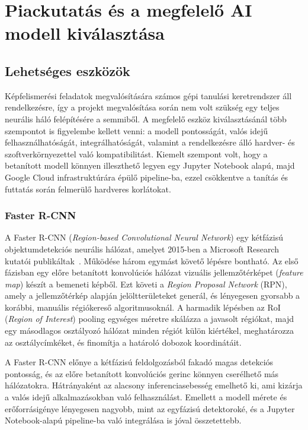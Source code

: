     \section{Piackutatás és a megfelelő AI modell kiválasztása}

        \subsection{Lehetséges eszközök}

        Képfelismerési feladatok megvalósítására számos gépi tanulási keretrendszer áll rendelkezésre, így a projekt megvalósítása során
        nem volt szükség egy teljes neurális háló felépítésére a semmiből. A megfelelő eszköz kiválasztásánál több szempontot is figyelembe
        kellett venni: a modell pontosságát, valós idejű felhasználhatóságát, integrálhatóságát, valamint a rendelkezésre álló hardver- és
        szoftverkörnyezettel való kompatibilitást. Kiemelt szempont volt, hogy a betanított modell könnyen illeszthető legyen egy Jupyter
        Notebook alapú, majd Google Cloud infrastruktúrára épülő pipeline-ba, ezzel csökkentve a tanítás és futtatás során
        felmerülő hardveres korlátokat.

        \subsubsection{Faster R-CNN}

        A Faster R-CNN (\textit{Region-based Convolutional Neural Network}) egy kétfázisú objektumdetekciós neurális hálózat,
        amelyet 2015-ben a Microsoft Research kutatói publikáltak~\cite{fasterrcnn}. Működése három egymást követő lépésre bontható.
        Az első fázisban egy előre betanított konvolúciós hálózat vizuális jellemzőtérképet (\textit{feature map}) készít a bemeneti
        képből. Ezt követi a \textit{Region Proposal Network} (RPN), amely a jellemzőtérkép alapján jelöltterületeket generál,
        és lényegesen gyorsabb a korábbi, manuális régiókereső algoritmusoknál. A harmadik lépésben az RoI (\textit{Region of Interest})
        pooling egységes méretre skálázza a javasolt régiókat, majd egy másodlagos osztályozó hálózat minden régiót külön kiértékel,
        meghatározza az osztálycímkéket, és finomítja a határoló dobozok koordinátáit.

        A Faster R-CNN előnye a kétfázisú feldolgozásból fakadó magas detekciós pontosság, és az előre betanított
        konvolúciós gerinc könnyen cserélhető más hálózatokra. Hátrányaként az alacsony inferenciasebesség emelhető ki,
        ami kizárja a valós idejű alkalmazásokban való felhasználást. Emellett a modell mérete és erőforrásigénye
        lényegesen nagyobb, mint az egyfázisú detektoroké, és a Jupyter Notebook-alapú pipeline-ba való integrálása is
        jóval összetettebb.

